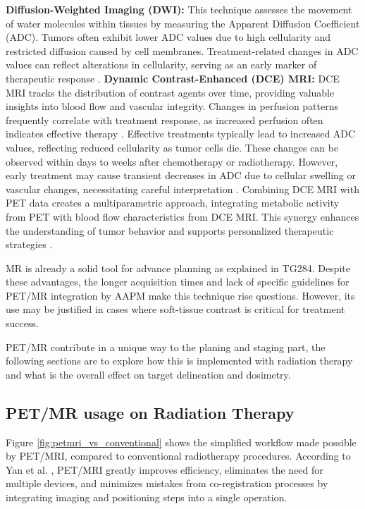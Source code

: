 \begin{multicols}{2}
\textbf{Diffusion-Weighted Imaging (DWI):} This technique assesses the movement of water molecules within tissues by measuring the Apparent Diffusion Coefficient (ADC). Tumors often exhibit lower ADC values due to high cellularity and restricted diffusion caused by cell membranes. Treatment-related changes in ADC values can reflect alterations in cellularity, serving as an early marker of therapeutic response \cite{pmc2010, ajr2006}.
\textbf{Dynamic Contrast-Enhanced (DCE) MRI:} DCE MRI tracks the distribution of contrast agents over time, providing valuable insights into blood flow and vascular integrity. Changes in perfusion patterns frequently correlate with treatment response, as increased perfusion often indicates effective therapy \cite{academic2021}.
Effective treatments typically lead to increased ADC values, reflecting reduced cellularity as tumor cells die. These changes can be observed within days to weeks after chemotherapy or radiotherapy. However, early treatment may cause transient decreases in ADC due to cellular swelling or vascular changes, necessitating careful interpretation \cite{pmc2010, pmc2009}.
Combining DCE MRI with PET data creates a multiparametric approach, integrating metabolic activity from PET with blood flow characteristics from DCE MRI. This synergy enhances the understanding of tumor behavior and supports personalized therapeutic strategies \cite{frontiers2020, springer2024}.

MR is already a solid tool for advance planning as explained in TG284\cite{TG284}. Despite these advantages, the longer acquisition times and lack of specific guidelines for PET/MR integration by AAPM make this technique rise questions. However, its use may be justified in cases where soft-tissue contrast is critical for treatment success. 

PET/MR contribute in a unique way to the planing and staging part, the following sections are to explore how this is implemented with radiation therapy and what is the overall effect on target delineation and dosimetry.



\subsection{PET/MR usage on Radiation Therapy}

Figure \ref{fig:petmri_vs_conventional} shows the simplified workflow made possible by PET/MRI, compared to conventional radiotherapy procedures. According to Yan et al. \cite{yan2024}, PET/MRI greatly improves efficiency, eliminates the need for multiple devices, and minimizes mistakes from co-registration processes by integrating imaging and positioning steps into a single operation.

\end{multicols}

